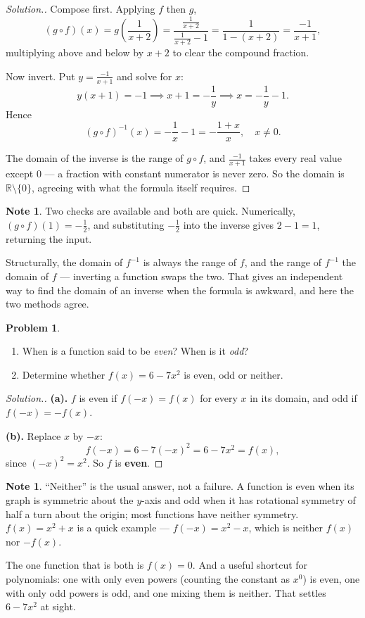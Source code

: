 \documentclass[11pt,a4paper]{article}
\theoremstyle{definition}
\newtheorem{note}[thm]{Note}
\newtheorem{problemx}{Problem}[section]
\newenvironment{problem}{\begin{problemx}}{\end{problemx}}
\newenvironment{solution}
  {\renewcommand{\qedsymbol}{}\begin{proof}[\textit{Solution}.]}
  {\end{proof}}
\begin{document}
\begin{solution}
Compose first. Applying $f$ then $g$,
$$\left(g\circ f\right)(x)=g\left(\frac{1}{x+2}\right)
=\frac{\frac{1}{x+2}}{\frac{1}{x+2}-1}
=\frac{1}{1-(x+2)}=\frac{-1}{x+1},$$
multiplying above and below by $x+2$ to clear the compound fraction.

Now invert. Put $y=\frac{-1}{x+1}$ and solve for $x$:
$$y(x+1)=-1 \implies x+1=-\frac{1}{y} \implies x=-\frac{1}{y}-1 .$$
Hence
$$\left(g\circ f\right)^{-1}(x)=-\frac{1}{x}-1=-\frac{1+x}{x},
\quad x\neq 0 .$$

The domain of the inverse is the range of $g\circ f$, and $\frac{-1}{x+1}$ takes
every real value except $0$ --- a fraction with constant numerator is never zero.
So the domain is $\mathbb{R}\setminus\{0\}$, agreeing with what the formula itself
requires.
\end{solution}

\begin{note}
Two checks are available and both are quick. Numerically,
$\left(g\circ f\right)(1)=-\frac{1}{2}$, and substituting $-\frac{1}{2}$ into the
inverse gives $2-1=1$, returning the input.

Structurally, the domain of $f^{-1}$ is always the range of $f$, and the range of
$f^{-1}$ the domain of $f$ --- inverting a function swaps the two. That gives an
independent way to find the domain of an inverse when the formula is awkward, and
here the two methods agree.
\end{note}

\pagebreak

\begin{problem}
\begin{enumerate}
\item[(a).] When is a function said to be \emph{even}? When is it \emph{odd}?
\item[(b).] Determine whether $f(x)=6-7x^{2}$ is even, odd or neither.
\end{enumerate}
\end{problem}

\begin{solution}
\textbf{(a).} $f$ is even if $f(-x)=f(x)$ for every $x$ in its domain, and odd if
$f(-x)=-f(x)$.

\textbf{(b).} Replace $x$ by $-x$:
$$f(-x)=6-7(-x)^{2}=6-7x^{2}=f(x),$$
since $(-x)^{2}=x^{2}$. So $f$ is \textbf{even}.
\end{solution}

\begin{note}
``Neither'' is the usual answer, not a failure. A function is even when its graph is
symmetric about the $y$-axis and odd when it has rotational symmetry of half a turn
about the origin; most functions have neither symmetry. $f(x)=x^{2}+x$ is a quick
example --- $f(-x)=x^{2}-x$, which is neither $f(x)$ nor $-f(x)$.

The one function that is both is $f(x)=0$. And a useful shortcut for polynomials:
one with only even powers (counting the constant as $x^{0}$) is even, one with only
odd powers is odd, and one mixing them is neither. That settles $6-7x^{2}$ at
sight.
\end{note}
\end{document}
